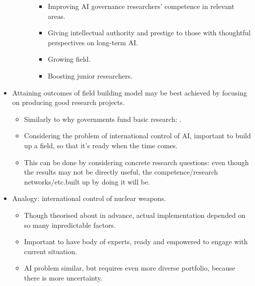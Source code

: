\begin{itemize}
\begin{itemize}
\begin{itemize}
\begin{itemize}
                \item Improving AI governance researchers' competence in relevant areas.
                \item Giving intellectual authority and prestige to those with thoughtful perspectives on long-term AI.
                \item Growing field.
                \item Boosting junior researchers.
            \end{itemize}
        \end{itemize}
    \end{itemize}
    \item Attaining outcomes of field building model may be best achieved by focusing on producing good research projects.
    \begin{itemize}
        \item Similarly to why governments fund basic research: .
        \item Considering the problem of international control of AI, important to build up a field, so that it's ready when the time comes.
        \item This can be done by considering concrete research questions: even though the results may not be directly useful, the competence/research networks/etc.\@ built up by doing it will be.
    \end{itemize}
    \item Analogy: international control of nuclear weapons.
    \begin{itemize}
        \item Though theorised about in advance, actual implementation depended on so many inpredictable factors.
        \item Important to have body of experts, ready and empowered to engage with current situation.
        \item AI problem similar, but requires even more diverse portfolio, because there is more uncertainty.
    \end{itemize}
\end{itemize}